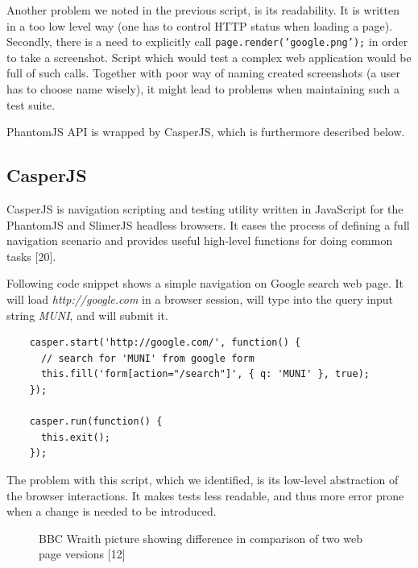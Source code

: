 \documentclass[11pt,oneside,final]{fithesis2}
\begin{document}
    Another problem we noted in the previous script, is its readability. It is written in a too low level way (one has to control HTTP status when loading a page). Secondly, there is a need
    to explicitly call \texttt{page.render('google.png');} in order to take a screenshot. Script which would test a complex web application would be full of such calls. Together with poor
    way of naming created screenshots (a user has to choose name wisely), it might lead to problems when maintaining such a test suite.
    
    PhantomJS API is wrapped by CasperJS, which is furthermore described below.
    
    \subsection{CasperJS}
    \label{subsec:casperJS}
    CasperJS is navigation scripting and testing utility written in JavaScript for the PhantomJS and SlimerJS headless browsers. It eases the process of defining a full navigation scenario 
    and provides useful high-level functions for doing common tasks [20].
    
    Following code snippet shows a simple navigation on Google search web page. It will load \textit{http://google.com} in a browser session, 
    will type into the query input string \textit{MUNI}, and will submit it.
    
    \begin{verbatim}
    casper.start('http://google.com/', function() {
      // search for 'MUNI' from google form
      this.fill('form[action="/search"]', { q: 'MUNI' }, true);
    });
   
    casper.run(function() {
      this.exit();
    });
    \end{verbatim}
    
    The problem with this script, which we identified, is its low-level abstraction of the browser interactions. It makes tests less readable, and thus more error prone when a change
    is needed to be introduced.
    
    \begin{figure}[!htb]
    \begin{center}
    \leavevmode
    \centerline{}
    \end{center}
    \caption{BBC Wraith picture showing difference in comparison of two web page versions [12]}
    \label{fig:bbcWraithDiff} 
  \end{figure}
\end{document}
